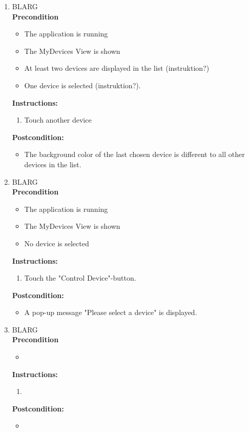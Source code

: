 \documentclass[a4paper]{article}
\newlength{\testlabellength}
\newenvironment{testlist}{\begin{enumerate}[label=\bfseries Instruction \thesubsection.\arabic* , labelindent=0pt, labelwidth=\testlabellength , leftmargin=2cm]}{\end{enumerate}}
\newenvironment{precondition}{
{\color{white}BLARG}\\ 
\textbf{Precondition}
\begin{itemize}[labelindent=0cm, labelwidth=2cm , leftmargin=1cm]
}
{\end{itemize}}
\newenvironment{instruction}{
\textbf{Instructions:}
\begin{enumerate}[label=\bfseries  \arabic*., labelindent=0cm, labelwidth=2cm , leftmargin=1cm]
}
{\end{enumerate}}
\newenvironment{postcondition}{
\textbf{Postcondition:}
\begin{itemize}[labelindent=0cm, labelwidth=2cm , leftmargin=1cm]
}
{\end{itemize}}
\begin{document}
\begin{appendices}
\begin{testlist}
    \item 
   		\begin{precondition}
   			\item The application is running
   			\item The MyDevices View is shown
   			\item At least two devices are displayed in the list (instruktion?)
   			\item One device is selected (instruktion?).
   		\end{precondition}
   		\begin{instruction}
   			\item Touch another device
   		\end{instruction}
   		\begin{postcondition}
   			\item The background color of the last chosen device is different to all other devices in the list.
   		\end{postcondition}
    
    \item
    	\begin{precondition}
    		\item The application is running
    		\item The MyDevices View is shown
    		\item No device is selected
    	\end{precondition}
    	\begin{instruction}
    		\item Touch the "Control Device"-button.
    	\end{instruction}
    	\begin{postcondition}
    		\item A pop-up message "Please select a device" is displayed.
    	\end{postcondition}
   
	\item
		\begin{precondition}
			\item
		\end{precondition}
		\begin{instruction}
			\item
		\end{instruction}
		\begin{postcondition}
			\item
		\end{postcondition}
		   

\end{testlist}
\end{appendices}
\end{document}
